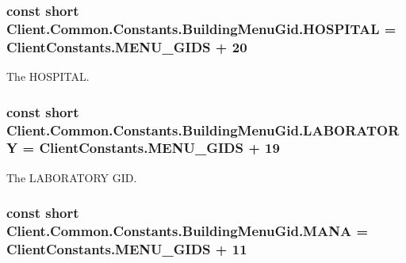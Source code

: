 \subsubsection[{H\+O\+S\+P\+I\+T\+A\+L}]{\setlength{\rightskip}{0pt plus 5cm}const short Client.\+Common.\+Constants.\+Building\+Menu\+Gid.\+H\+O\+S\+P\+I\+T\+A\+L = {\bf Client\+Constants.\+M\+E\+N\+U\+\_\+\+G\+I\+D\+S} + 20}\label{classClient_1_1Common_1_1Constants_1_1BuildingMenuGid_a84fce8500604ec8f8ef5f68837e13e65}


The H\+O\+S\+P\+I\+T\+A\+L. 

\hypertarget{classClient_1_1Common_1_1Constants_1_1BuildingMenuGid_aad3226ea535e019083375bad81083c5f}{}
\subsubsection[{L\+A\+B\+O\+R\+A\+T\+O\+R\+Y}]{\setlength{\rightskip}{0pt plus 5cm}const short Client.\+Common.\+Constants.\+Building\+Menu\+Gid.\+L\+A\+B\+O\+R\+A\+T\+O\+R\+Y = {\bf Client\+Constants.\+M\+E\+N\+U\+\_\+\+G\+I\+D\+S} + 19}\label{classClient_1_1Common_1_1Constants_1_1BuildingMenuGid_aad3226ea535e019083375bad81083c5f}


The L\+A\+B\+O\+R\+A\+T\+O\+R\+Y G\+I\+D. 

\hypertarget{classClient_1_1Common_1_1Constants_1_1BuildingMenuGid_a336a6e66f824092f7edb0edf4bfbc1ba}{}
\subsubsection[{M\+A\+N\+A}]{\setlength{\rightskip}{0pt plus 5cm}const short Client.\+Common.\+Constants.\+Building\+Menu\+Gid.\+M\+A\+N\+A = {\bf Client\+Constants.\+M\+E\+N\+U\+\_\+\+G\+I\+D\+S} + 11}\label{classClient_1_1Common_1_1Constants_1_1BuildingMenuGid_a336a6e66f824092f7edb0edf4bfbc1ba}


